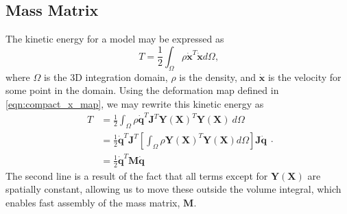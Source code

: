\subsection{Mass Matrix}
The kinetic energy for a model may be expressed as
\begin{equation}
T = \frac{1}{2}\int_{ \Omega} \rho \dot{\mathbf{x}}^T\dot{\mathbf{x}} d\Omega
\text{,}
\end{equation}
where $\Omega$ is the 3D integration domain, $\rho$ is the density, and $\dot{\mathbf{x}}$ is the velocity for some point in the domain. Using the deformation map defined in \ref{eqn:compact_x_map}, we may rewrite this kinetic energy as
\begin{equation}
\begin{split}
T & = \frac{1}{2}\int_{ \Omega} \rho \dot{\mathbf{q}}^T \mathbf{J}^T\mathbf{Y(X)}^T\mathbf{Y(X)}\ d\Omega \\
  & = \frac{1}{2} \dot{\mathbf{q}}^T \mathbf{J}^T \left[ \int_{ \Omega} \rho \mathbf{Y(X)}^T\mathbf{Y(X)} d\Omega \right] \mathbf{J}\dot{\mathbf{q}} \\
  & = \frac{1}{2} \dot{\mathbf{q}}^T \mathbf{M} \dot{\mathbf{q}}
\end{split}
\text{.}
\end{equation}
The second line is a result of the fact that all terms except for $\mathbf{Y(X)}$ are spatially constant, allowing us to move these outside the volume integral, which enables fast assembly of the mass matrix, $\mathbf{M}$.

